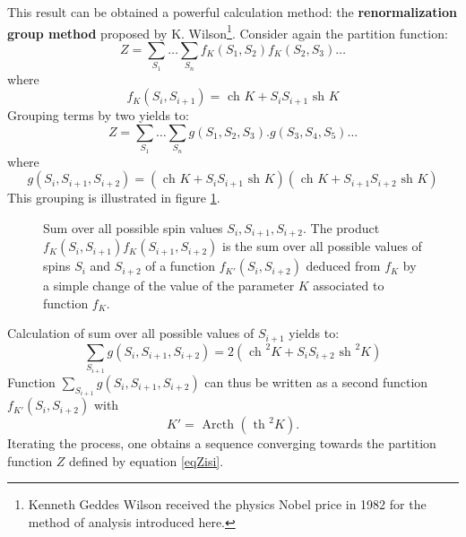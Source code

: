 \documentclass[12pt]{book}
\begin{document}
This result can be obtained a powerful calculation method: the {\bf
  renormalization group
  method}\cite{ph:physt:Diu89,ma:equad:Schuster88}
 proposed by  K. Wilson\footnote{Kenneth
  Geddes Wilson received the physics Nobel price in 1982 for the
  method of analysis introduced here.}. 
Consider again the partition function:
\begin{equation}
Z=\sum_{S_1}\dots\sum_{S_n}f_K(S_1,S_2)f_K(S_2,S_3)\dots
\end{equation}
where
\begin{equation}
f_{K}(S_i,S_{i+1})=\mbox{ ch } K +S_iS_{i+1}\mbox{ sh }K
\end{equation}
Grouping terms by two yields to:
\begin{equation}
Z=\sum_{S_1}\dots\sum_{S_n}g(S_1,S_2,S_3).g(S_3,S_4,S_5)\dots
\end{equation}
where
\begin{equation}
g(S_i,S_{i+1},S_{i+2})=(\mbox{ ch } K +S_iS_{i+1}\mbox{ sh }K)(\mbox{ ch } K +S_{i+1}S_{i+2}\mbox{ sh }K)
\end{equation}
This grouping is illustrated in figure \ref{figrenorm}.
\begin{figure}[htb]
 \centerline{}  
\caption{Sum over all possible spin values $S_{i},S_{i+1},S_{i+2}$. The product
$f_K(S_i,S_{i+1})f_K(S_{i+1},S_{i+2})$ is the sum over all possible values of
spins $S_{i}$ and $S_{i+2}$ of a function $f_{K'}(S_{i},S_{i+2})$ deduced from
$f_K$ by a simple change of the value of the parameter
$K$ associated to function $f_K$.} 
 \label{figrenorm}
\end{figure}
Calculation of sum over all possible values of $S_{i+1}$ yields to:
\begin{equation}
\sum_{S_{i+1}}g(S_i,S_{i+1},S_{i+2})=2(\mbox{ ch }^2K+S_{i}S_{i+2}\mbox{ sh }^2K)
\end{equation}
Function $\sum_{S_{i+1}}g(S_i,S_{i+1},S_{i+2})$ can thus be written as a
second function $f_{K'}(S_i,S_{i+2})$ with
\begin{equation}
K'=\mbox{ Arcth }(\mbox{ th }^2K).
\end{equation}
Iterating the process, one obtains a sequence converging towards
the partition function $Z$ defined by equation \ref{eqZisi}.
\end{document}
